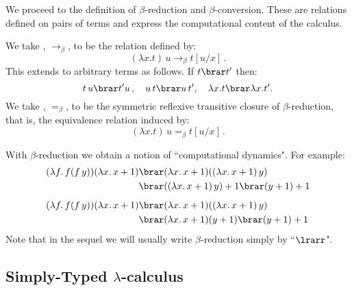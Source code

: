 \documentclass{svmult}
\begin{document}
%
%
%
We proceed to the definition of $\beta$-reduction and $\beta$-conversion. These are relations defined on pairs of terms and express the
computational content of the calculus.
%
\begin{mydefinition}
We take , $\longrightarrow_\beta$, to be the relation defined by: %
\[ (\lambda x. t)\,u \longrightarrow_\beta t[u/x]\,. \]
This extends to arbitrary terms as follows. If $t\brar t'$ then:
\[ t\,u\brar t'u\,,\quad u\,t\brar u\,t',\quad \lambda x.t\brar\lambda x.t'.\]
We take , $=_\beta$, to be the symmetric reflexive transitive closure of $\beta$-reduction, that is, the
equivalence relation induced by:
\[ (\lambda x.t)\,u =_\beta t[u/x]\,. \]\deq[-1]
\end{mydefinition}
%
With $\beta$-reduction we obtain a notion of ``computational dynamics". For example:
\begin{align*}
(\lambda f.\,f(f\,y))(\lambda x.\,x+1) &\brar (\lambda x.\,x+1)((\lambda x.\,x+1)\,y) \\
    &\brar((\lambda x.\,x+1)\,y)+1\brar(y+1)+1 \\[5pt]
(\lambda f.\,f(f\,y))(\lambda x.\,x+1) &\brar (\lambda x.\,x+1)((\lambda x.\,x+1)\,y) \\
    &\brar(\lambda x.\,x+1)(y+1)\brar(y+1)+1
\end{align*}
Note that in the sequel we will usually write $\beta$-reduction simply by ``$\lrarr$".

\subsection{Simply-Typed $\lambda$-calculus}
\end{document}

